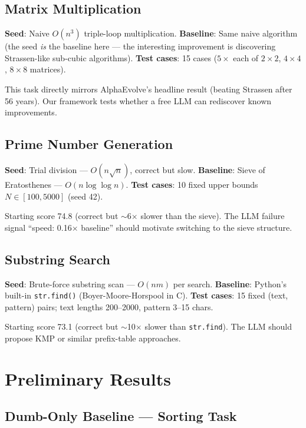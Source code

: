 \documentclass[11pt,a4paper]{article}
\begin{document}
\subsection{Matrix Multiplication}

\textbf{Seed}: Naive $O(n^3)$ triple-loop multiplication.
\textbf{Baseline}: Same naive algorithm (the seed \emph{is} the baseline here — the
interesting improvement is discovering Strassen-like sub-cubic algorithms).
\textbf{Test cases}: 15 cases ($5 \times$ each of $2\times2$, $4\times4$, $8\times8$ matrices).

This task directly mirrors AlphaEvolve's headline result (beating Strassen after
56 years). Our framework tests whether a free LLM can rediscover known improvements.

\subsection{Prime Number Generation}

\textbf{Seed}: Trial division — $O(n\sqrt{n})$, correct but slow.
\textbf{Baseline}: Sieve of Eratosthenes — $O(n \log \log n)$.
\textbf{Test cases}: 10 fixed upper bounds $N \in [100, 5000]$ (seed 42).

Starting score 74.8 (correct but $\sim$6$\times$ slower than the sieve).
The LLM failure signal ``speed: 0.16$\times$ baseline'' should motivate
switching to the sieve structure.

\subsection{Substring Search}

\textbf{Seed}: Brute-force substring scan — $O(nm)$ per search.
\textbf{Baseline}: Python's built-in \texttt{str.find()} (Boyer-Moore-Horspool in C).
\textbf{Test cases}: 15 fixed (text, pattern) pairs; text lengths 200--2000, pattern 3--15 chars.

Starting score 73.1 (correct but $\sim$10$\times$ slower than \texttt{str.find}).
The LLM should propose KMP or similar prefix-table approaches.

\section{Preliminary Results}

\subsection{Dumb-Only Baseline — Sorting Task}
\end{document}

